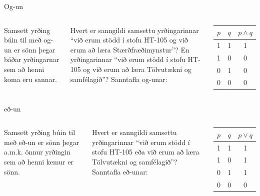 \documentclass{beamer}
\begin{document}
\begin{frame}{Og-un}
\begin{columns}
Samsett yrðing búin til með og-un er sönn þegar báðar yrðingarnar sem að henni koma eru sannar.

\vspace*{0.5cm}
Hvert er sanngildi samsettu yrðingarinnar ``við erum stödd í stofu HT-105 og við erum að læra Stærðfræðimynstur''? En yrðingarinnar ``við erum stödd í stofu HT-105 og við erum að læra Tölvutækni og samfélagið''?
Sanntafla og-unar:
\begin{center}
\begin{tabular}{ccc}
\toprule
$p$&$q$&$p \land q$ \\
\midrule
1&1&1\\
1&0&0\\
0&1&0\\
0&0&0\\
\bottomrule
\end{tabular}
\end{center}
\end{columns}
\end{frame}

\begin{frame}{eð-un}
\begin{columns}
Samsett yrðing búin til með eð-un er sönn þegar a.m.k. önnur yrðingin sem að henni kemur er sönn.

\vspace*{0.5cm}
Hvert er sanngildi samsettu yrðingarinnar ``við erum stödd í stofu HT-105 eða við erum að læra Tölvutækni og samfélagið''?
Sanntafla eð-unar:
\begin{center}
\begin{tabular}{ccc}
\toprule
$p$&$q$&$p \lor q$ \\
\midrule
1&1&1\\
1&0&1\\
0&1&1\\
0&0&0\\
\bottomrule
\end{tabular}
\end{center}
\end{columns}
\end{frame}
\end{document}
